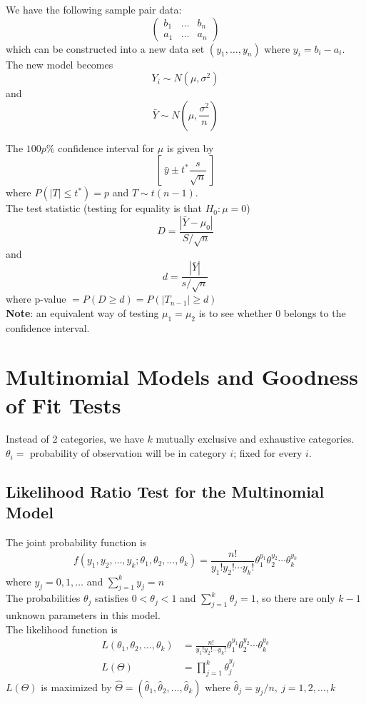 \documentclass[12pt]{article}
\theoremstyle{definition}
\begin{document}
  We have the following sample pair data:
  \[
  \begin{pmatrix}
    b_{1} & \dots & b_{n} \\
    a_{1} & \dots & a_{n}
  \end{pmatrix}
  \]
  which can be constructed into a new data set $(y_1, \dots, y_n)$ where $y_i = b_i - a_i$. \\
  The new model becomes
  $$Y_{i} \sim N(\mu, \sigma^{2})$$
  and
  $$\bar{Y} \sim N(\mu, \frac{\sigma^{2}}{n})$$

  The $100p\%$ confidence interval for $\mu$ is given by
  $$\left[~\bar{y} \pm t^{*}\frac{s}{\sqrt{n}}~\right]$$
  where $P(|T| \leq t^{*}) = p$ and $T \sim t(n - 1)$. \\

  The test statistic (testing for equality is that $H_{0} : \mu = 0$)
  $$D = \frac{|\bar{Y} - \mu_{0}|}{S/\sqrt{n}}$$
  and
  $$d = \frac{|\bar{Y}|}{s/\sqrt{n}}$$
  where p-value $= P(D \geq d) = P(|T_{n-1}| \geq d)$ \\

  \textbf{Note}: an equivalent way of testing $\mu_{1} = \mu_{2}$ is to see whether 0 belongs to the confidence interval.

  \newpage
  \section{Multinomial Models and Goodness of Fit Tests}
  Instead of 2 categories, we have $k$ mutually exclusive and exhaustive categories. \\
  $\theta_{i} =$ probability of observation will be in category $i$; fixed for every $i$.
  \subsection{Likelihood Ratio Test for the Multinomial Model}
  The joint probability function is
  \[
  f(y_{1}, y_{2}, \dots, y_{k}; \theta_{1}, \theta_{2}, \dots, \theta_{k})
  =
  \frac{n!}{y_{1}!y_{2}!\cdots y_{k}!}\theta_{1}^{y_{1}}\theta_{2}^{y_{2}}\cdots\theta_{k}^{y_{k}}
  \]
  where $y_{j} = 0, 1, \dots$ and $\sum_{j=1}^{k}y_{j} = n$ \\
  The probabilities $\theta_{j}$ satisfies $0 < \theta_{j} < 1$ and $\sum_{j=1}^{k}\theta_{j} = 1$, so there are only $k - 1$ unknown parameters in this model. \\

  The likelihood function is
  \begin{align*}
    L(\theta_{1}, \theta_{2}, \dots, \theta_{k}) &=
    \frac{n!}{y_{1}!y_{2}!\cdots y_{k}!}\theta_{1}^{y_{1}}\theta_{2}^{y_{2}}\cdots\theta_{k}^{y_{k}} \\
    L(\Theta) &= \prod_{j=1}^{k}\theta_{j}^{y_{j}}
  \end{align*}
  $L(\Theta)$ is maximized by $\hat{\Theta} = (\hat{\theta}_{1}, \hat{\theta}_{2}, \dots, \hat{\theta}_{k})$ where $\hat{\theta}_{j} = y_{j} / n, ~j = 1, 2, \dots, k$ \\
\end{document}
